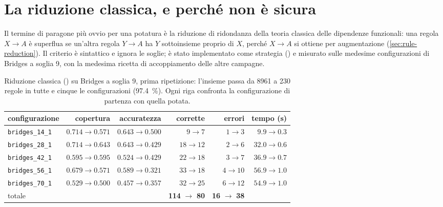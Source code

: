 \section{La riduzione classica, e perché non è sicura}\label{sec:res-classical}

Il termine di paragone più ovvio per una potatura è la riduzione di ridondanza della teoria
classica delle dipendenze funzionali: una regola $X \to A$ è superflua se un'altra regola
$Y \to A$ ha $Y$ sottoinsieme proprio di $X$, perché $X \to A$ si ottiene per augmentazione
(\autoref{sec:rule-reduction}). Il criterio è sintattico e ignora le soglie; è stato implementato
come strategia () e misurato sulle medesime configurazioni di Bridges a
soglia 9, con la medesima ricetta di accoppiamento delle altre campagne.

\begin{table}[htbp]
\centering
\caption{Riduzione classica () su Bridges a soglia 9, prima ripetizione:
l'insieme passa da \num{8961} a \num{230} regole in tutte e cinque le configurazioni
(\SI{97.4}{\percent}). Ogni riga confronta la configurazione di partenza con quella potata.}
\label{tab:res-classical}
\footnotesize
\begin{tabular}{@{}lrrrrr@{}}
\toprule
configurazione & copertura & accuratezza & corrette & errori & tempo (\si{\second}) \\
\midrule
\texttt{bridges\_14\_1} & $0.714 \to 0.571$ & $0.643 \to 0.500$ & $9 \to 7$   & $1 \to 3$   & $9.9 \to 0.3$ \\
\texttt{bridges\_28\_1} & $0.714 \to 0.643$ & $0.643 \to 0.429$ & $18 \to 12$ & $2 \to 6$   & $32.0 \to 0.6$ \\
\texttt{bridges\_42\_1} & $0.595 \to 0.595$ & $0.524 \to 0.429$ & $22 \to 18$ & $3 \to 7$   & $36.9 \to 0.7$ \\
\texttt{bridges\_56\_1} & $0.679 \to 0.571$ & $0.589 \to 0.321$ & $33 \to 18$ & $4 \to 10$  & $56.9 \to 1.0$ \\
\texttt{bridges\_70\_1} & $0.529 \to 0.500$ & $0.457 \to 0.357$ & $32 \to 25$ & $6 \to 12$  & $54.9 \to 1.0$ \\
\midrule
totale & & & \textbf{114} $\to$ \textbf{80} & \textbf{16} $\to$ \textbf{38} & \\
\bottomrule
\end{tabular}
\end{table}

